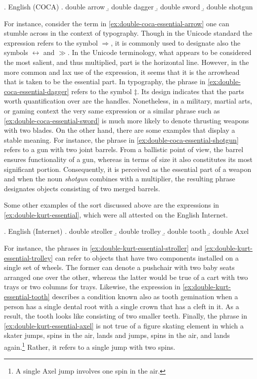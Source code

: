 \ex. English (COCA)\label{ex:double-coca-essential}
\a. double arrow\label{ex:double-coca-essential-arrow}
\b. double dagger\label{ex:double-coca-essential-dagger}
\b. double sword\label{ex:double-coca-essential-sword}
\b. double shotgun\label{ex:double-coca-essential-shotgun}

For instance, consider the term in \ref{ex:double-coca-essential-arrow} one can stumble across in the context of typography. Though in the Unicode standard the expression refers to the symbol $\Rightarrow$, it is commonly used to designate also the symbols $\leftrightarrow$ and $\gg$. In the Unicode terminology, what appears to be considered the most salient, and thus multiplied, part is the horizontal line. However, in the more common and lax use of the expression, it seems that it is the arrowhead that is taken to be the essential part. In typography, the phrase in \ref{ex:double-coca-essential-dagger} refers to the symbol $\ddagger$. Its design indicates that the parts worth quantification over are the handles. Nonetheless, in a military, martial arts, or gaming context the very same expression or a similar phrase such as \ref{ex:double-coca-essential-sword} is much more likely to denote thrusting weapons with two blades. On the other hand, there are some examples that display a stable meaning. For instance, the phrase in \ref{ex:double-coca-essential-shotgun} refers to a gun with two joint barrels. From a ballistic point of view, the barrel ensures functionality of a gun, whereas in terms of size it also constitutes its most significant portion. Consequently, it is perceived as the essential part of a weapon and when the noun \textit{shotgun} combines with a multiplier, the resulting phrase designates objects consisting of two merged barrels.

Some other examples of the sort discussed above are the expressions in \ref{ex:double-kurt-essential}, which were all attested on the English Internet. 

\ex. English (Internet)\label{ex:double-kurt-essential}
\a. double stroller\label{ex:double-kurt-essential-stroller}
\b. double trolley\label{ex:double-kurt-essential-trolley}
\b. double tooth\label{ex:double-kurt-essential-tooth}
\b. double Axel\label{ex:double-kurt-essential-axel} 

For instance, the phrases in \ref{ex:double-kurt-essential-stroller} and \ref{ex:double-kurt-essential-trolley} can refer to objects that have two components installed on a single set of wheels. The former can denote a pushchair with two baby seats arranged one over the other, whereas the latter would be true of a cart with two trays or two columns for trays. Likewise, the expression in \ref{ex:double-kurt-essential-tooth} describes a condition known also as tooth gemination when a person has a single dental root with a single crown that has a cleft in it. As a result, the tooth looks like consisting of two smaller teeth. Finally, the phrase in \ref{ex:double-kurt-essential-axel} is not true of a figure skating element in which a skater jumps, spins in the air, lands and jumps, spins in the air, and lands again.\footnote{A single Axel jump involves one spin in the air.} Rather, it refers to a single jump with two spins.

